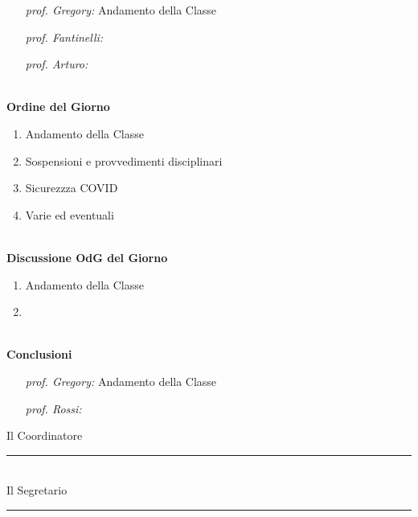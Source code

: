 \documentclass[11pt]{article}
\begin{document}
\begin{enumerate}[label=\roman*]
	\item [\em prof. Gregory:]Andamento della Classe
	\item [\em prof. Fantinelli:]\lipsum[4]
	\item [\em prof. Arturo:]\lipsum[6]
\end{enumerate}
\vspace{12pt}
\par\noindent\dotfill{}\\[10pt]
{\bf Ordine del Giorno}
\begin{enumerate}
	\item Andamento della Classe
	\item Sospensioni e provvedimenti disciplinari
	\item Sicurezzza COVID
	\item Varie ed eventuali
\end{enumerate}

\vspace{12pt}
\par\noindent\dotfill{}\\[10pt]
{\bf Discussione OdG del Giorno}
\begin{enumerate}
	\item Andamento della Classe
	\item 
\end{enumerate}

\vspace{12pt}
\par\noindent\dotfill{}\\[12pt]
{\bf Conclusioni}
\begin{enumerate}[label=\roman*]
	\item [\em prof. Gregory:]Andamento della Classe
	\item [\em prof. Rossi:]\lipsum[2]
\end{enumerate}
\vfill
\begin{center}
\begin{multicols}{2}
	Il Coordinatore\\[12pt] \rule{4cm}{0.4pt}\\
	Il Segretario\\[12pt]	\rule{4cm}{0.4pt}\\ 
	\end{multicols}
\end{center}

\end{document}

